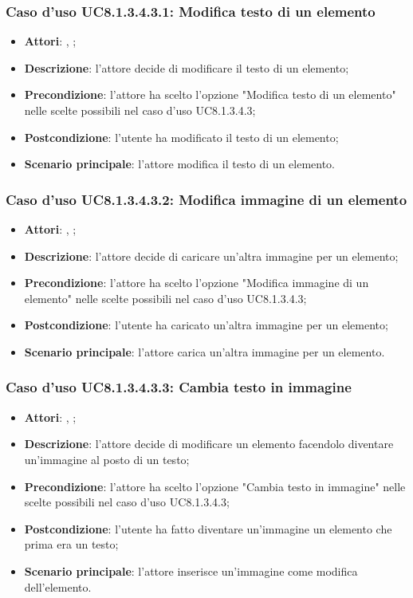 		\subsubsection{Caso d'uso UC8.1.3.4.3.1: Modifica testo di un elemento}
		\label{UC8.1.3.4.3.1}
		\begin{itemize}
			\item \textbf{Attori}: \uau, \uaupro;
			\item \textbf{Descrizione}: l'attore decide di modificare il testo di un elemento;
			\item \textbf{Precondizione}: l'attore ha scelto l'opzione "Modifica testo di un elemento" nelle scelte possibili nel caso d'uso UC8.1.3.4.3;
			\item \textbf{Postcondizione}: l'utente ha modificato il testo di un elemento;
			\item \textbf{Scenario principale}: l'attore modifica il testo di un elemento.  
		\end{itemize}
		
		\subsubsection{Caso d'uso UC8.1.3.4.3.2: Modifica immagine di un elemento}
		\label{UC8.1.3.4.3.2}
		\begin{itemize}
			\item \textbf{Attori}: \uau, \uaupro;
			\item \textbf{Descrizione}: l'attore decide di caricare un'altra immagine per un elemento;
			\item \textbf{Precondizione}: l'attore ha scelto l'opzione "Modifica immagine di un elemento" nelle scelte possibili nel caso d'uso UC8.1.3.4.3;
			\item \textbf{Postcondizione}: l'utente ha caricato un'altra immagine per un elemento;
			\item \textbf{Scenario principale}: l'attore carica un'altra immagine per un elemento.
		\end{itemize}
		
		\subsubsection{Caso d'uso UC8.1.3.4.3.3: Cambia testo in immagine}
		\label{UC8.1.3.4.3.3}
		\begin{itemize}
			\item \textbf{Attori}: \uau, \uaupro;
			\item \textbf{Descrizione}: l'attore decide di modificare un elemento facendolo diventare un'immagine al posto di un testo;
			\item \textbf{Precondizione}: l'attore ha scelto l'opzione "Cambia testo in immagine" nelle scelte possibili nel caso d'uso UC8.1.3.4.3;
			\item \textbf{Postcondizione}: l'utente ha fatto diventare un'immagine un elemento che prima era un testo;
			\item \textbf{Scenario principale}: l'attore inserisce un'immagine come modifica dell'elemento.  
		\end{itemize}
		
